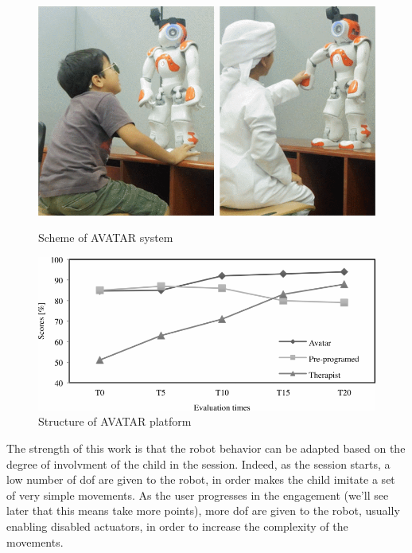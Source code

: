 \documentclass[12pt,journal,draftclsnofoot,onecolumn]{IEEEtran}
\begin{document}
\begin{figure}[h]
\centering

\begin{minipage}{0.48\textwidth}
\centering
\includegraphics[width=\textwidth]{nao_robot.png}
\caption{Scheme of AVATAR system}
\label{fig:nao_robot}
\end{minipage}
\begin{minipage}{0.48\textwidth}
\centering
\includegraphics[width=\textwidth]{scores.png}
\caption{Structure of AVATAR platform}
\label{fig:scores}
\end{minipage}

\end{figure}

The strength of this work is that the robot behavior can be adapted based on the degree of involvment of the child in the session.
Indeed, as the session starts, a low number of \gls{dof} are given to the robot, in order makes the child imitate a set of very simple movements.
As the user progresses in the engagement (we'll see later that this means take more points), more \gls{dof} are given to the robot, usually enabling disabled actuators, in order to increase the complexity of the movements.
\end{document}
